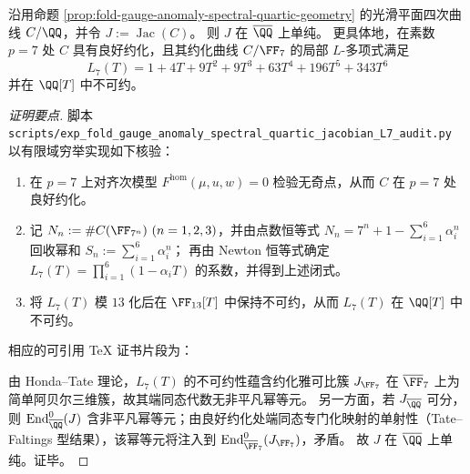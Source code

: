\begin{proposition}\label{prop:fold-gauge-anomaly-spectral-quartic-jacobian-simple}
沿用命题 \ref{prop:fold-gauge-anomaly-spectral-quartic-geometry} 的光滑平面四次曲线 \(C/\QQ\)，并令 \(J:=\operatorname{Jac}(C)\)。
则 \(J\) 在 \(\overline{\QQ}\) 上单纯。
更具体地，在素数 \(p=7\) 处 \(C\) 具有良好约化，且其约化曲线 \(C/\FF_{7}\) 的局部 \(L\)-多项式满足
\[
\boxed{\ L_{7}(T)=1+4T+9T^{2}+9T^{3}+63T^{4}+196T^{5}+343T^{6}\ }
\]
并在 \(\QQ[T]\) 中不可约。
\end{proposition}
\begin{proof}[证明要点]
脚本 \texttt{scripts/exp\_fold\_gauge\_anomaly\_spectral\_quartic\_jacobian\_L7\_audit.py} 以有限域穷举实现如下核验：
\begin{enumerate}
  \item 在 \(p=7\) 上对齐次模型 \(F^{\mathrm{hom}}(\mu,u,w)=0\) 检验无奇点，从而 \(C\) 在 \(p=7\) 处良好约化。
  \item 记 \(N_n:=\#C(\FF_{7^{n}})\ (n=1,2,3)\)，并由点数恒等式
  \(
  N_n=7^n+1-\sum_{i=1}^{6}\alpha_i^{n}
  \)
  回收幂和 \(S_n:=\sum_{i=1}^{6}\alpha_i^{n}\)；
  再由 Newton 恒等式确定 \(L_7(T)=\prod_{i=1}^{6}(1-\alpha_iT)\) 的系数，并得到上述闭式。
  \item 将 \(L_7(T)\) 模 \(13\) 化后在 \(\FF_{13}[T]\) 中保持不可约，从而 \(L_7(T)\) 在 \(\QQ[T]\) 中不可约。
\end{enumerate}
相应的可引用 TeX 证书片段为：

\par
由 Honda--Tate 理论，\(L_7(T)\) 的不可约性蕴含约化雅可比簇 \(J_{\FF_7}\) 在 \(\overline{\FF}_7\) 上为简单阿贝尔三维簇，故其端同态代数无非平凡幂等元。
另一方面，若 \(J_{\overline{\QQ}}\) 可分，则 \(\mathrm{End}^0_{\overline{\QQ}}(J)\) 含非平凡幂等元；由良好约化处端同态专门化映射的单射性（Tate--Faltings 型结果），该幂等元将注入到 \(\mathrm{End}^0_{\overline{\FF}_{7}}(J_{\FF_7})\)，矛盾。
故 \(J\) 在 \(\overline{\QQ}\) 上单纯。证毕。
\end{proof}

\endinput
